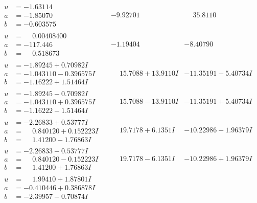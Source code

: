 \documentclass[1p]{elsarticle_modified}
\theoremstyle{definition}
\begin{document}
$$\begin{array}{c|c|c}
\begin{aligned}
u &= -1.63114\phantom{ +0.000000I} \\
a &= -1.85070\phantom{ +0.000000I} \\
b &= -0.603575\phantom{ +0.000000I}\end{aligned}
 & -9.92701\phantom{ +0.000000I} & \phantom{-}35.8110\phantom{ +0.000000I} \\ \hline\begin{aligned}
u &= \phantom{-}0.00408400\phantom{ +0.000000I} \\
a &= -117.446\phantom{ +0.000000I} \\
b &= \phantom{-}0.518673\phantom{ +0.000000I}\end{aligned}
 & -1.19404\phantom{ +0.000000I} & -8.40790\phantom{ +0.000000I} \\ \hline\begin{aligned}
u &= -1.89245 + 0.70982 I \\
a &= -1.043110 - 0.396575 I \\
b &= -1.16222 + 1.51464 I\end{aligned}
 & \phantom{-}15.7088 + 13.9110 I & -11.35191 - 5.40734 I \\ \hline\begin{aligned}
u &= -1.89245 - 0.70982 I \\
a &= -1.043110 + 0.396575 I \\
b &= -1.16222 - 1.51464 I\end{aligned}
 & \phantom{-}15.7088 - 13.9110 I & -11.35191 + 5.40734 I \\ \hline\begin{aligned}
u &= -2.26833 + 0.53777 I \\
a &= \phantom{-}0.840120 + 0.152223 I \\
b &= \phantom{-}1.41200 - 1.76863 I\end{aligned}
 & \phantom{-}19.7178 + 6.1351 I & -10.22986 - 1.96379 I \\ \hline\begin{aligned}
u &= -2.26833 - 0.53777 I \\
a &= \phantom{-}0.840120 - 0.152223 I \\
b &= \phantom{-}1.41200 + 1.76863 I\end{aligned}
 & \phantom{-}19.7178 - 6.1351 I & -10.22986 + 1.96379 I \\ \hline\begin{aligned}
u &= \phantom{-}1.99410 + 1.87801 I \\
a &= -0.410446 + 0.386878 I \\
b &= -2.39957 - 0.70874 I\end{aligned}

\end{array}$$
\end{document}
